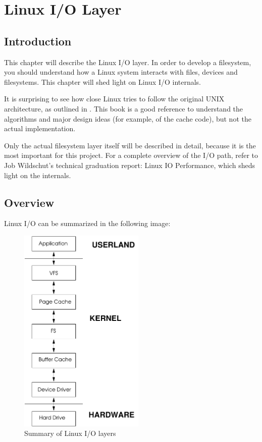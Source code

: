 \newcommand{\prototype}[1]{
	\begin{tabularx}{\textwidth}{|l|X|}
	\hline
	Prototype&\texttt{#1} \\
	\hline
	\end{tabularx}
}

\chapter{Linux I/O Layer}

\section{Introduction}

This chapter will describe the Linux I/O layer. In order to develop a filesystem, you should understand how a Linux system interacts with files, devices and filesystems. This chapter will shed light on Linux I/O internals.

It is surprising to see how close Linux tries to follow the original UNIX architecture, as outlined in \cite{TDotUOS}. This book is a good reference to understand the algorithms and major design ideas (for example, of the cache code), but not the actual implementation.

Only the actual filesystem layer itself will be described in detail, because it is the most important for this project. For a complete overview of the I/O path, refer to Job Wildschut's technical graduation report: Linux IO Performance, which sheds light on the internals. \cite{LIOP}

\newpage

\section{Overview}

Linux I/O can be summarized in the following image:

\begin{figure}[h]
\includegraphics[height=10cm]{io-overview}
\caption{Summary of Linux I/O layers}
\end{figure}


